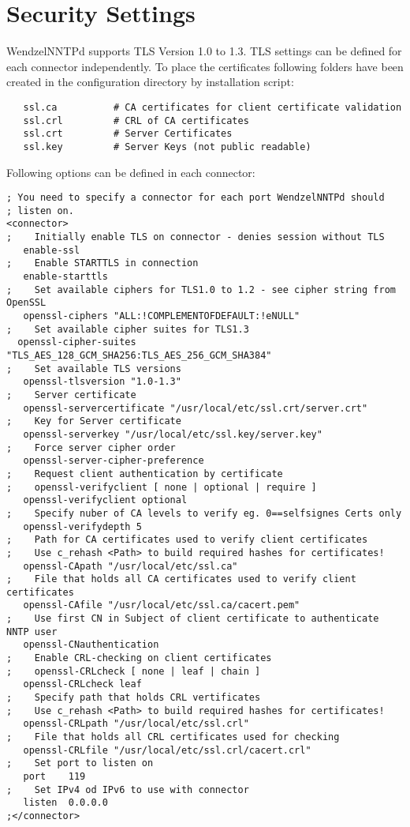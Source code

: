 \section{Security Settings}

WendzelNNTPd supports TLS Version 1.0 to 1.3.
TLS settings can be defined for each connector independently.
To place the certificates following folders have been created in the configuration directory by installation script:
\begin{verbatim}
   ssl.ca          # CA certificates for client certificate validation
   ssl.crl         # CRL of CA certificates
   ssl.crt         # Server Certificates
   ssl.key         # Server Keys (not public readable)   
\end{verbatim}

Following options can be defined in each connector:
\begin{verbatim}
; You need to specify a connector for each port WendzelNNTPd should
; listen on.
<connector>
;    Initially enable TLS on connector - denies session without TLS
   enable-ssl
;    Enable STARTTLS in connection
   enable-starttls
;    Set available ciphers for TLS1.0 to 1.2 - see cipher string from OpenSSL
   openssl-ciphers "ALL:!COMPLEMENTOFDEFAULT:!eNULL"
;    Set available cipher suites for TLS1.3
  openssl-cipher-suites "TLS_AES_128_GCM_SHA256:TLS_AES_256_GCM_SHA384"
;    Set available TLS versions
   openssl-tlsversion "1.0-1.3"
;    Server certificate
   openssl-servercertificate "/usr/local/etc/ssl.crt/server.crt"
;    Key for Server certificate
   openssl-serverkey "/usr/local/etc/ssl.key/server.key"
;    Force server cipher order
   openssl-server-cipher-preference
;    Request client authentication by certificate
;    openssl-verifyclient [ none | optional | require ]
   openssl-verifyclient optional
;    Specify nuber of CA levels to verify eg. 0==selfsignes Certs only
   openssl-verifydepth 5
;    Path for CA certificates used to verify client certificates
;    Use c_rehash <Path> to build required hashes for certificates!
   openssl-CApath "/usr/local/etc/ssl.ca"
;    File that holds all CA certificates used to verify client certificates
   openssl-CAfile "/usr/local/etc/ssl.ca/cacert.pem"
;    Use first CN in Subject of client certificate to authenticate NNTP user
   openssl-CNauthentication
;    Enable CRL-checking on client certificates
;    openssl-CRLcheck [ none | leaf | chain ]
   openssl-CRLcheck leaf
;    Specify path that holds CRL vertificates
;    Use c_rehash <Path> to build required hashes for certificates!
   openssl-CRLpath "/usr/local/etc/ssl.crl"
;    File that holds all CRL certificates used for checking
   openssl-CRLfile "/usr/local/etc/ssl.crl/cacert.crl"
;    Set port to listen on
   port    119
;    Set IPv4 od IPv6 to use with connector
   listen  0.0.0.0
;</connector>
\end{verbatim}

